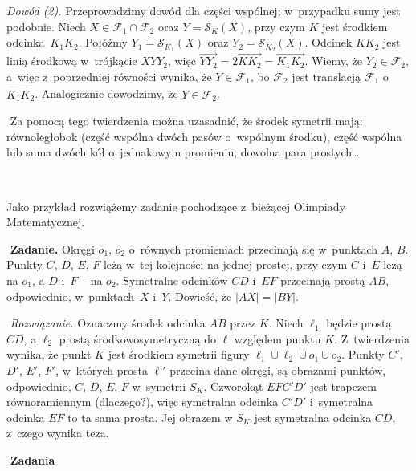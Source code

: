 \begin{dwieszpalty}
\emph{Dowód (2).} Przeprowadzimy dowód dla części wspólnej; w~przypadku sumy jest podobnie. Niech ${X\in \mathcal{F}_1\cap\mathcal{F}_2}$ oraz $Y=\mathcal{S}_K(X)$, przy czym $K$ jest środkiem odcinka~$K_1K_2$. Połóżmy $Y_1=\mathcal{S}_{K_1}(X)$ oraz $Y_2=\mathcal{S}_{K_2}(X)$. Odcinek $KK_2$ jest linią środkową w~trójkącie $XYY_2$, więc $\overrightarrow{YY_2} = 2\overrightarrow{KK_2} = \overrightarrow{K_1K_2}$. Wiemy, że $Y_2\in\mathcal{F}_2$, a~więc z~poprzedniej równości wynika, że $Y\in\mathcal{F}_1$, bo $\mathcal{F}_2$ jest translacją $\mathcal{F}_1$ o~$\overrightarrow{K_1K_2}$. Analogicznie dowodzimy, że $Y\in\mathcal{F}_2$.\par
﻿
Za pomocą tego twierdzenia można uzasadnić, że środek symetrii mają: równoległobok (część wspólna dwóch pasów o~wspólnym środku), część wspólna lub suma dwóch kół o~jednakowym promieniu, dowolna para prostych\dots\par
﻿

Jako przykład rozwiążemy zadanie pochodzące z~bieżącej Olimpiady Matematycznej.\par
﻿
\textbf{Zadanie.} Okręgi $o_1$, $o_2$ o~równych promieniach przecinają się w~punktach $A$, $B$. Punkty $C$, $D$, $E$, $F$ leżą w~tej kolejności na jednej prostej, przy czym $C$ i~$E$ leżą na $o_1$, a $D$ i~$F$ -- na $o_2$. Symetralne odcinków $CD$ i~$EF$ przecinają prostą $AB$, odpowiednio, w~punktach~$X$ i~$Y$. Dowieść, że $|AX| = |BY|$.\par
﻿
\emph{Rozwiązanie.} Oznaczmy środek odcinka $AB$ przez $K$. Niech $\ell_1$ będzie prostą $CD$, a $\ell_2$ prostą środkowosymetryczną do $\ell$ względem punktu $K$. Z~twierdzenia wynika, że punkt $K$ jest środkiem symetrii figury $\ell_1\cup\ell_2\cup o_1\cup o_2$. Punkty $C'$, $D'$, $E'$, $F'$, w~których prosta $\ell'$ przecina dane okręgi, są obrazami punktów, odpowiednio, $C$, $D$, $E$, $F$ w~symetrii $S_K$. Czworokąt $EFC'D'$ jest trapezem równoramiennym (dlaczego?), więc symetralna odcinka $C'D'$ i~symetralna odcinka $EF$ to ta sama prosta. Jej obrazem w $S_K$ jest symetralna odcinka $CD$, z~czego wynika teza. \par\end{dwieszpalty}
﻿
\textbf{Zadania}
